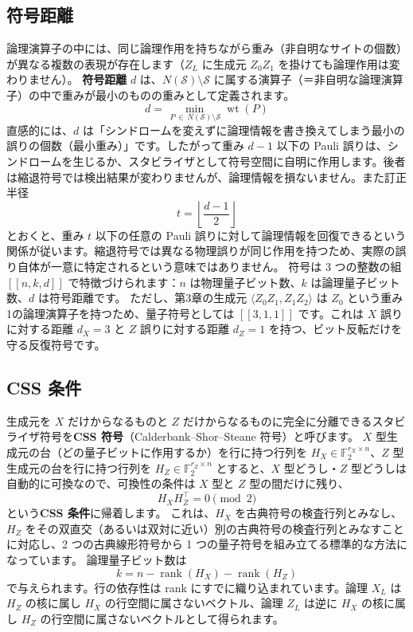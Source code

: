 \subsection{符号距離}

論理演算子の中には、同じ論理作用を持ちながら重み（非自明なサイトの個数）が異なる複数の表現が存在します（$Z_L$ に生成元 $Z_0Z_1$ を掛けても論理作用は変わりません）。
\textbf{符号距離} $d$ は、$N(\mathcal{S})\setminus\mathcal{S}$ に属する演算子（＝非自明な論理演算子）の中で重みが最小のものの重みとして定義されます。
\begin{equation}
  d = \min_{\, P \,\in\, N(\mathcal{S}) \setminus \mathcal{S}} \operatorname{wt}(P)
\end{equation}
直感的には、$d$ は「シンドロームを変えずに論理情報を書き換えてしまう最小の誤りの個数（最小重み）」です。したがって重み $d-1$ 以下の Pauli 誤りは、シンドロームを生じるか、スタビライザとして符号空間に自明に作用します。後者は縮退符号では検出結果が変わりませんが、論理情報を損ないません。また訂正半径
\begin{equation}
  t = \left\lfloor \frac{d-1}{2} \right\rfloor
\end{equation}
とおくと、重み $t$ 以下の任意の Pauli 誤りに対して論理情報を回復できるという関係が従います。縮退符号では異なる物理誤りが同じ作用を持つため、実際の誤り自体が一意に特定されるという意味ではありません。
符号は 3 つの整数の組 $[[n,k,d]]$ で特徴づけられます：$n$ は物理量子ビット数、$k$ は論理量子ビット数、$d$ は符号距離です。
ただし、第3章の生成元 $\langle Z_0Z_1,Z_1Z_2\rangle$ は $Z_0$ という重み1の論理演算子を持つため、量子符号としては $[[3,1,1]]$ です。これは $X$ 誤りに対する距離 $d_X=3$ と $Z$ 誤りに対する距離 $d_Z=1$ を持つ、ビット反転だけを守る反復符号です。

\subsection{CSS 条件}

生成元を $X$ だけからなるものと $Z$ だけからなるものに完全に分離できるスタビライザ符号を\textbf{CSS 符号}（Calderbank–Shor–Steane 符号）と呼びます。
$X$ 型生成元の台（どの量子ビットに作用するか）を行に持つ行列を $H_X \in \mathbb{F}_2^{r_X \times n}$、$Z$ 型生成元の台を行に持つ行列を $H_Z \in \mathbb{F}_2^{r_Z \times n}$ とすると、$X$ 型どうし・$Z$ 型どうしは自動的に可換なので、可換性の条件は $X$ 型と $Z$ 型の間だけに残り、
\begin{equation}
  H_X H_Z^{\top} = 0 \pmod 2
\end{equation}
という\textbf{CSS 条件}に帰着します。
これは、$H_X$ を古典符号の検査行列とみなし、$H_Z$ をその双直交（あるいは双対に近い）別の古典符号の検査行列とみなすことに対応し、2 つの古典線形符号から 1 つの量子符号を組み立てる標準的な方法になっています。
論理量子ビット数は
\begin{equation}
  k = n - \operatorname{rank}(H_X) - \operatorname{rank}(H_Z)
\end{equation}
で与えられます。行の依存性は rank にすでに織り込まれています。論理 $X_L$ は $H_Z$ の核に属し $H_X$ の行空間に属さないベクトル、論理 $Z_L$ は逆に $H_X$ の核に属し $H_Z$ の行空間に属さないベクトルとして得られます\cite{calderbank1996css,steane1996qec}。


